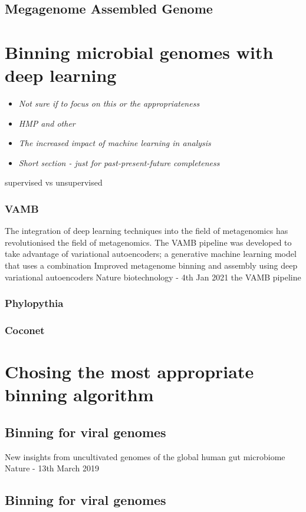 \documentclass{article}
\begin{document}
\subsection{Megagenome Assembled Genome}

\section{Binning microbial genomes with deep learning}
\begin{itemize}
	\item \emph{Not sure if to focus on this or the appropriateness}
	\item \emph{HMP and other }
	\item \emph{The increased impact of machine learning in analysis}
	\item \emph{Short section - just for past-present-future completeness}
\end{itemize}
supervised vs unsupervised
\subsubsection{VAMB}
The integration of deep learning techniques into the field of metagenomics has revolutionised the field of metagenomics.
The VAMB pipeline was developed to take advantage of variational autoencoders; a generative machine learning model that uses a combination 
Improved metagenome binning and assembly using deep variational autoencoders
Nature biotechnology - 4th Jan 2021
the VAMB pipeline \cite{nissenimproved}
\subsubsection{Phylopythia}
\subsubsection{Coconet}

\section{Chosing the most appropriate binning algorithm}
\subsection{Binning for viral genomes}
New insights from uncultivated genomes of the global human gut microbiome
Nature - 13th March 2019 \cite{nayfach2019new}

\subsection{Binning for viral genomes}
\end{document}
